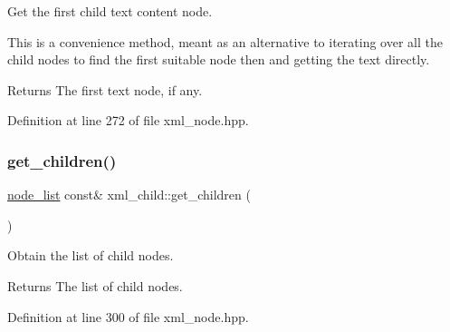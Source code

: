 Get the first child text content node. 

This is a convenience method, meant as an alternative to iterating over all the child nodes to find the first suitable node then and getting the text directly. \begin{DoxyReturn}{Returns}
The first text node, if any. 
\end{DoxyReturn}


Definition at line 272 of file xml\+\_\+node.\+hpp.

\mbox{\label{classxml__child_ac4b78d575689b828c0859d8f4f02fbac}} 
\subsubsection{\texorpdfstring{get\+\_\+children()}{get\_children()}\hspace{0.1cm}{\footnotesize\ttfamily [1/2]}}
{\footnotesize\ttfamily \hyperlink{classxml__node_a4e558f6b9e873e9d0e92cfc8e7880385}{node\+\_\+list} const\& xml\+\_\+child\+::get\+\_\+children (\begin{DoxyParamCaption}{ }\end{DoxyParamCaption})\hspace{0.3cm}{\ttfamily [inline]}}



Obtain the list of child nodes. 

\begin{DoxyReturn}{Returns}
The list of child nodes. 
\end{DoxyReturn}


Definition at line 300 of file xml\+\_\+node.\+hpp.



